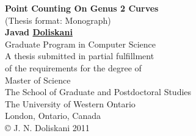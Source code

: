 \thispagestyle{empty}
\vspace*{1.5in}
\begin{center}
\LARGE
\textbf{Point Counting On Genus 2 Curves} \\
\normalsize
\bigskip
(Thesis format: Monograph)\\
\smallskip
\textbf{Javad \underline{Doliskani}}\\
\vspace*{1in}
Graduate Program in Computer Science\\
\vspace*{0.3in}
A thesis submitted in partial fulfillment\\
of the requirements for the degree of\\
Master of Science\\
\vspace*{0.3in}
The School of Graduate and Postdoctoral Studies\\
The University of Western Ontario\\
London, Ontario, Canada\\
\vfill
\copyright \hspace*{0.07in} J. N. Doliskani 2011  \\
\end{center}
